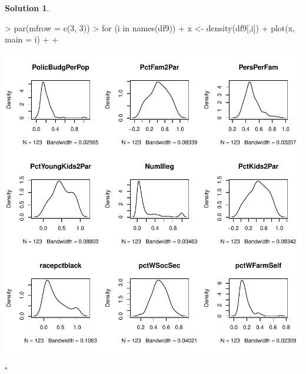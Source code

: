 \documentclass[twoside]{article}
\theoremstyle{definition}
\newtheorem*{solutionT}{Solution}
\newenvironment{solution}{\begin{cBox}\begin{solutionT}}{\hfill{\scriptsize\ensuremath{\square}}\end{solutionT}\end{cBox}}
\theoremstyle{definition}
\begin{document}
\begin{enumerate}
\begin{solution}
\begin{Schunk}
\begin{Sinput}
> par(mfrow = c(3, 3))
> for (i in names(df9)) {
+   x <- density(df9[,i])
+   plot(x, main = i) 
+   
+ }
\end{Sinput}
\end{Schunk}
\includegraphics{week1-024}


\end{solution}
\end{enumerate}
\end{document}
